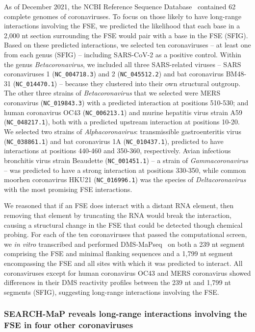 \documentclass[main.tex]{subfiles}
\begin{document}
As of December 2021, the NCBI Reference Sequence Database~\cite{OLeary2016} contained 62 complete genomes of coronaviruses.
To focus on those likely to have long-range interactions involving the FSE, we predicted the likelihood that each base in a 2,000 nt section surrounding the FSE would pair with a base in the FSE (SFIG).
Based on these predicted interactions, we selected ten coronaviruses -- at least one from each genus (SFIG) -- including SARS-CoV-2 as a positive control.
Within the genus \textit{Betacoronavirus}, we included all three SARS-related viruses -- SARS coronaviruses 1 (\verb|NC_004718.3|) and 2 (\verb|NC_045512.2|) and bat coronavirus BM48-31 (\verb|NC_014470.1|) -- because they clustered into their own structural outgroup.
The other three strains of \textit{Betacoronavirus} that we selected were MERS coronavirus (\verb|NC_019843.3|) with a predicted interaction at positions 510-530; and human coronavirus OC43 (\verb|NC_006213.1|) and murine hepatitis virus strain A59 (\verb|NC_048217.1|), both with a predicted upstream interaction at positions 10-20.
We selected two strains of \textit{Alphacoronavirus}: transmissible gastroenteritis virus (\verb|NC_038861.1|) and bat coronavirus 1A (\verb|NC_010437.1|), predicted to have interactions at positions 440-460 and 350-360, respectively.
Avian infectious bronchitis virus strain Beaudette (\verb|NC_001451.1|) -- a strain of \textit{Gammacoronavirus} -- was predicted to have a strong interaction at positions 330-350, while common moorhen coronavirus HKU21 (\verb|NC_016996.1|) was the species of \textit{Deltacoronavirus} with the most promising FSE interactions.

We reasoned that if an FSE does interact with a distant RNA element, then removing that element by truncating the RNA would break the interaction, causing a structural change in the FSE that could be detected though chemical probing.
For each of the ten coronaviruses that passed the computational screen, we \textit{in vitro} transcribed and performed DMS-MaPseq~\cite{Zubradt2016} on both a 239 nt segment comprising the FSE and minimal flanking sequences and a 1,799 nt segment encompassing the FSE and all sites with which it was predicted to interact.
All coronaviruses except for human coronavirus OC43 and MERS coronavirus showed differences in their DMS reactivity profiles between the 239 nt and 1,799 nt segments (SFIG), suggesting long-range interactions involving the FSE.

\subsubsection{SEARCH-MaP reveals long-range interactions involving the FSE in four other coronaviruses}
\end{document}
